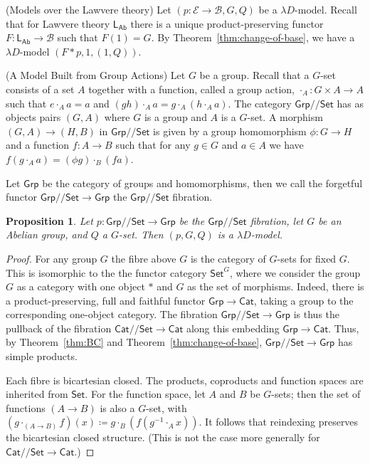 \documentclass[a4paper,UKenglish]{lipics}
\newtheorem{proposition}[theorem]{Proposition}
\newcommand{\msf}[1]{\mathsf{#1}} %
\newcommand{\Grp}{\msf{Grp}}
\newcommand{\Set}{\msf{Set}}
\newcommand{\Cat}{\msf{Cat}}
\newcommand{\LAb}{\msf{L}_{\msf{Ab}}}
\newcommand{\B}{\mathcal{B}}
\newcommand{\E}{\mathcal{E}}
\newcommand{\Lslice}[1]{#1/\!/\Set}
\newcommand{\GrpSet}{\Lslice{\Grp}}
\newcommand{\CatSet}{\Lslice{\Cat}}
\begin{document}
\begin{example}(Models over the Lawvere theory)
\label{ex:Lawvere}
Let $(p:\E\to\B,G,Q)$ be a $\lambda D$-model.
Recall that for Lawvere theory $\LAb$ 
there is a unique product-preserving functor
$F:\LAb\to \B$ such that $F(1)=G$.  
By Theorem~\ref{thm:change-of-base},
we have a $\lambda D$-model $(F\ast p,1,(1,Q))$. 
\end{example}
\begin{example}(A Model Built from Group Actions)
\label{ex:MonAct}
Let $G$ be a group. Recall that a $G$-set consists of a set $A$ together with a function, called a group action, $\cdot_A:G\times A\to A$ such that $e\cdot_{A} a=a$ and $(gh)\cdot_A a=g\cdot_A (h\cdot_A a)$. The category $\GrpSet$ has as objects pairs $(G,A)$ where $G$ is a group and $A$ is a $G$-set. A morphism $(G,A) \rightarrow (H,B)$ in $\GrpSet$ is given by a group homomorphism $\phi:G\rightarrow H$ and a function $f:A \rightarrow B$ such that for any $g\in G$ and $a\in A$ we have $f (g\cdot_A a) = (\phi g)\cdot_B (f a)$.

Let $\Grp$ be the category of groups and homomorphisms, then we call the forgetful functor $\GrpSet\to \Grp$ the $\GrpSet$ fibration.

\begin{proposition}
Let $p:\GrpSet \rightarrow \Grp$ be the $\GrpSet$ fibration, let $G$ be an Abelian group, and $Q$ a $G$-set. Then $(p,G,Q)$ is a $\lambda D$-model.
\end{proposition}

\begin{proof}
For any group $G$ the fibre above $G$ is the category of $G$-sets for fixed $G$.
This is isomorphic to the
the functor category ${\Set}^G$,
where we consider the group $G$ as a category with one object $*$
and $G$ as the set of morphisms.
Indeed, there is a product-preserving, full and faithful functor $\Grp\to\Cat$,
taking a group to the corresponding one-object category.
The fibration $\GrpSet\to\Grp$ is thus the pullback of
the fibration $\CatSet\to\Cat$ along this embedding $\Grp \to \Cat$.
Thus, by Theorem~\ref{thm:BC} and Theorem~\ref{thm:change-of-base},
$\GrpSet\to\Grp$ has simple products.

Each fibre is bicartesian closed.
The products, coproducts and function spaces are inherited from $\Set$.
For the function space, let $A$ and $B$ be $G$-sets;
then the set of functions $(A\to B)$ is also a $G$-set,
with $(g\cdot_{(A\to B)}f)(x)\coloneqq g\cdot_B(f(g^{-1}\cdot_A x))$.
It follows that reindexing preserves the bicartesian closed structure.
(This is not the case more generally for $\CatSet\to\Cat$.)


\end{proof}
\end{example}
\end{document}
